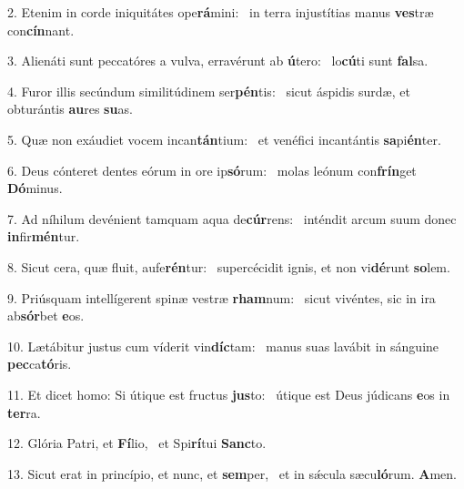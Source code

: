 2. Etenim in corde iniquitátes ope\textbf{rá}mini: \ast\  in terra injustítias manus \textbf{ves}træ con\textbf{cín}nant.\

3. Alienáti sunt peccatóres a vulva, erravérunt ab \textbf{ú}tero: \ast\  lo\textbf{cú}ti sunt \textbf{fal}sa.\

4. Furor illis secúndum similitúdinem ser\textbf{pén}tis: \ast\  sicut áspidis surdæ, et obturántis \textbf{au}res \textbf{su}as.\

5. Quæ non exáudiet vocem incan\textbf{tán}tium: \ast\  et venéfici incantántis \textbf{sa}pi\textbf{én}ter.\

6. Deus cónteret dentes eórum in ore ip\textbf{só}rum: \ast\  molas leónum con\textbf{frín}get \textbf{Dó}minus.\

7. Ad níhilum devénient tamquam aqua de\textbf{cúr}rens: \ast\  inténdit arcum suum donec \textbf{in}fir\textbf{mén}tur.\

8. Sicut cera, quæ fluit, aufe\textbf{rén}tur: \ast\  supercécidit ignis, et non vi\textbf{dé}runt \textbf{so}lem.\

9. Priúsquam intellígerent spinæ vestræ \textbf{rham}num: \ast\  sicut vivéntes, sic in ira ab\textbf{sór}bet \textbf{e}os.\

10. Lætábitur justus cum víderit vin\textbf{díc}tam: \ast\  manus suas lavábit in sánguine \textbf{pec}ca\textbf{tó}ris.\

11. Et dicet homo: Si útique est fructus \textbf{jus}to: \ast\  útique est Deus júdicans \textbf{e}os in \textbf{ter}ra.\

12. Glória Patri, et \textbf{Fí}lio, \ast\  et Spi\textbf{rí}tui \textbf{Sanc}to.\

13. Sicut erat in princípio, et nunc, et \textbf{sem}per, \ast\  et in sǽcula sæcu\textbf{ló}rum. \textbf{A}men.\

